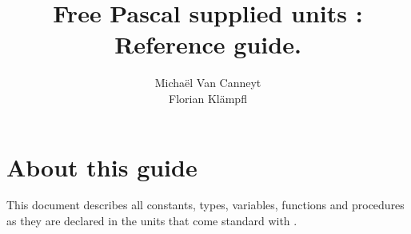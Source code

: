 %
%
%
%
%

%
%
\makeindex
%
%
%
\usepackage{syntax}

%
%

\title{Free Pascal supplied units : \\ Reference guide.}

\author{Micha\"el Van Canneyt\\ Florian Kl\"ampfl}
\maketitle
\tableofcontents
\newpage

\section*{About this guide}
This document describes all constants, types, variables, functions and
procedures as they are declared in the units that come standard with \fpc.

